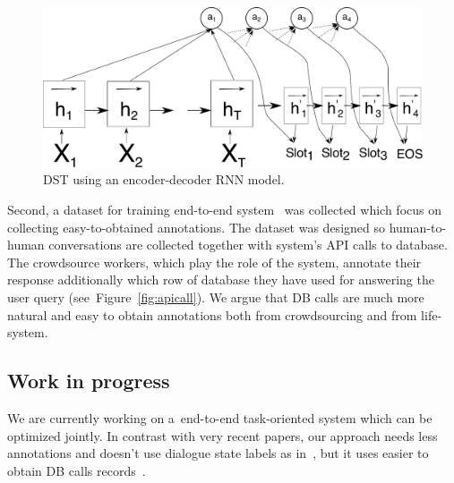 \documentclass[11pt]{article}
\begin{document}
\begin{figure}[htb]
    \centering
    \includegraphics[width=1.0\linewidth]{dst_seq2seq}
    \caption{DST using an encoder-decoder RNN model.}
\label{fig:dst_seq2seq}
\end{figure}

Second, a dataset for training end-to-end system~\cite{platek2016wochat} was collected which focus on collecting easy-to-obtained annotations.
The dataset was designed so human-to-human conversations are collected together with system's API calls to database.
The crowdsource workers, which play the role of the system, annotate their response additionally which row of database they have used for answering the user query (see~Figure~\ref{fig:apicall}).
We argue that DB calls are much more natural and easy to obtain annotations both from crowdsourcing and from life-system. 

\subsection{Work in progress}\label{sec:wip}

We are currently working on a~end-to-end task-oriented system which can be optimized jointly.
In contrast with very recent papers, our approach needs less annotations and doesn't use dialogue state labels as in~\cite{wen_networkbased_2016}, but it uses easier to obtain DB calls records~\cite{platek2016wochat}.
\end{document}
